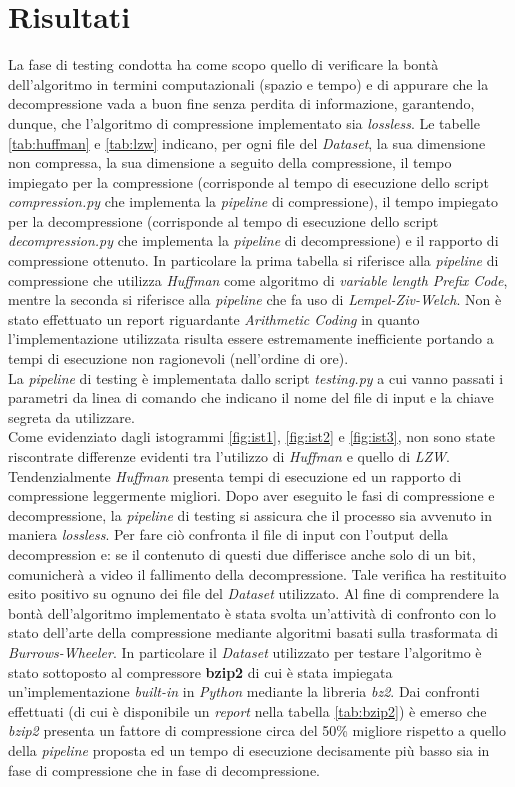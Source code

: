 \section{Risultati}\label{section:risultati}
La fase di testing condotta ha come scopo quello di verificare la bontà dell'algoritmo in termini computazionali (spazio e tempo) e di appurare che la decompressione vada a buon fine senza perdita di informazione, garantendo, dunque, che l'algoritmo di compressione implementato sia \emph{lossless}. Le tabelle \ref{tab:huffman} e \ref{tab:lzw} indicano, per ogni file del \emph{Dataset}, la sua dimensione non compressa, la sua dimensione a seguito della compressione, il tempo impiegato per la compressione (corrisponde al tempo di esecuzione dello script \emph{compression.py} che implementa la \emph{pipeline} di compressione), il tempo impiegato per la decompressione (corrisponde al tempo di esecuzione dello script \emph{decompression.py} che implementa la \emph{pipeline} di decompressione) e il rapporto di compressione ottenuto. In particolare la prima tabella si riferisce alla \emph{pipeline} di compressione che utilizza \emph{Huffman} come algoritmo di \emph{variable length Prefix Code}, mentre la seconda si riferisce alla \emph{pipeline} che fa uso di \emph{Lempel-Ziv-Welch}. Non è stato effettuato un report riguardante \emph{Arithmetic Coding} in quanto l'implementazione utilizzata risulta essere estremamente inefficiente portando a tempi di esecuzione non ragionevoli (nell'ordine di ore). \\ La \emph{pipeline} di testing è implementata dallo script \emph{testing.py} a cui vanno passati i parametri da linea di comando che indicano il nome del file di input e la chiave segreta da utilizzare.\\
Come evidenziato dagli istogrammi \ref{fig:ist1}, \ref{fig:ist2} e \ref{fig:ist3}, non sono state riscontrate differenze evidenti tra l'utilizzo di \emph{Huffman} e quello di \emph{LZW}. Tendenzialmente \emph{Huffman} presenta tempi di esecuzione ed un rapporto di compressione leggermente migliori.
Dopo aver eseguito le fasi di compressione e decompressione, la \emph{pipeline} di testing si assicura che il processo sia avvenuto in maniera \emph{lossless}. Per fare ciò confronta il file di input con l'output della decompression        e: se il contenuto di questi due differisce anche solo di un bit, comunicherà a video il fallimento della decompressione. Tale verifica ha restituito esito positivo su ognuno dei file del \emph{Dataset} utilizzato. Al fine di comprendere la bontà dell'algoritmo implementato è stata svolta un'attività di confronto con lo stato dell'arte della compressione mediante algoritmi basati sulla trasformata di \emph{Burrows-Wheeler}. In particolare il \emph{Dataset} utilizzato per testare l'algoritmo è stato sottoposto al compressore \textbf{bzip2} di cui è stata impiegata un'implementazione \emph{built-in} in \emph{Python} mediante la libreria \emph{bz2}. Dai confronti effettuati (di cui è disponibile un \emph{report} nella tabella \ref{tab:bzip2}) è emerso che \emph{bzip2} presenta un fattore di compressione circa del 50\% migliore rispetto a quello della \emph{pipeline} proposta ed un tempo di esecuzione decisamente più basso sia in fase di compressione che in fase di decompressione.
